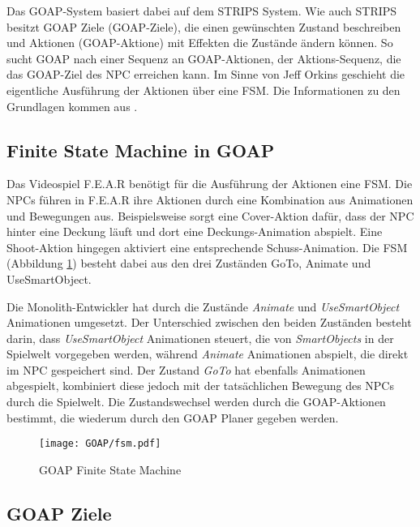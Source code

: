 Das GOAP-System basiert dabei auf dem STRIPS System. Wie auch STRIPS besitzt GOAP Ziele (GOAP-Ziele), die einen gew\"{u}nschten Zustand beschreiben und Aktionen (GOAP-Aktione) mit Effekten die Zust\"{a}nde \"{a}ndern k\"{o}nnen. So sucht GOAP nach einer Sequenz an GOAP-Aktionen, der Aktions-Sequenz, die das GOAP-Ziel des NPC erreichen kann. Im Sinne von Jeff Orkins geschieht die eigentliche Ausf\"{u}hrung der Aktionen \"{u}ber eine FSM. Die Informationen zu den Grundlagen kommen aus \autocite{fear, fear2, fear3}.


\subsection{Finite State Machine in GOAP}
\label{chap:fsm goap}

Das Videospiel F.E.A.R ben\"{o}tigt f\"{u}r die Ausf\"{u}hrung der Aktionen eine FSM. Die NPCs f\"{u}hren in F.E.A.R ihre Aktionen durch eine Kombination aus Animationen und Bewegungen aus. Beispielsweise sorgt eine Cover-Aktion daf\"{u}r, dass der NPC hinter eine Deckung l\"{a}uft und dort eine Deckungs-Animation abspielt. Eine Shoot-Aktion hingegen aktiviert eine entsprechende Schuss-Animation. Die FSM (Abbildung \ref{fig:Goap FSM}) besteht dabei aus den drei Zust\"{a}nden GoTo, Animate und UseSmartObject.

Die Monolith-Entwickler hat durch die Zust\"{a}nde \textit{Animate} und \textit{UseSmartObject} Animationen umgesetzt. Der Unterschied zwischen den beiden Zust\"{a}nden besteht darin, dass \textit{UseSmartObject} Animationen steuert, die von \textit{SmartObjects} in der Spielwelt vorgegeben werden, w\"{a}hrend \textit{Animate} Animationen abspielt, die direkt im NPC gespeichert sind. Der Zustand \textit{GoTo} hat ebenfalls Animationen abgespielt, kombiniert diese jedoch mit der tats\"{a}chlichen Bewegung des NPCs durch die Spielwelt. Die Zustandswechsel werden durch die GOAP-Aktionen bestimmt, die wiederum durch den GOAP Planer gegeben werden.

\begin{figure}[h]
  \centering
  \texttt{[image: GOAP/fsm.pdf]}
	\captionsetup{justification=justified, format=plain}
  \caption{GOAP Finite State Machine}
  \label{fig:Goap FSM}
\end{figure}


\subsection{GOAP Ziele}
\label{chap:goap ziele}

